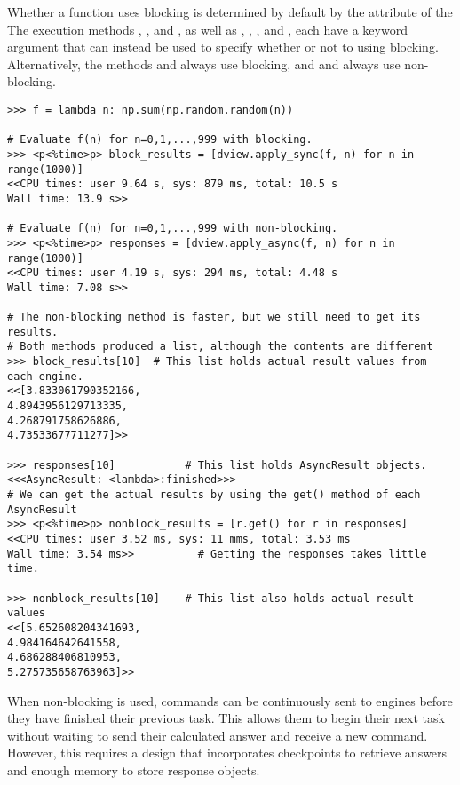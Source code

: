 Whether a function uses blocking is determined by default by the  attribute of the 
The execution methods , , and , as well as , , , and , each have a keyword argument  that can instead be used to specify whether or not to using blocking.
Alternatively, the methods  and  always use blocking, and  and  always use non-blocking.


\begin{lstlisting}
>>> f = lambda n: np.sum(np.random.random(n))

# Evaluate f(n) for n=0,1,...,999 with blocking.
>>> <p<%time>p> block_results = [dview.apply_sync(f, n) for n in range(1000)]
<<CPU times: user 9.64 s, sys: 879 ms, total: 10.5 s
Wall time: 13.9 s>>

# Evaluate f(n) for n=0,1,...,999 with non-blocking.
>>> <p<%time>p> responses = [dview.apply_async(f, n) for n in range(1000)]
<<CPU times: user 4.19 s, sys: 294 ms, total: 4.48 s
Wall time: 7.08 s>>

# The non-blocking method is faster, but we still need to get its results.
# Both methods produced a list, although the contents are different
>>> block_results[10]  # This list holds actual result values from each engine.
<<[3.833061790352166,
4.8943956129713335,
4.268791758626886,
4.73533677711277]>>

>>> responses[10]           # This list holds AsyncResult objects.
<<<AsyncResult: <lambda>:finished>>>
# We can get the actual results by using the get() method of each AsyncResult
>>> <p<%time>p> nonblock_results = [r.get() for r in responses]
<<CPU times: user 3.52 ms, sys: 11 mms, total: 3.53 ms
Wall time: 3.54 ms>>          # Getting the responses takes little time.

>>> nonblock_results[10]    # This list also holds actual result values
<<[5.652608204341693,
4.984164642641558,
4.686288406810953,
5.275735658763963]>>
\end{lstlisting}
When non-blocking is used, commands can be continuously sent to engines before they have finished their previous task.
This allows them to begin their next task without waiting to send their calculated answer and receive a new command.
However, this requires a design that incorporates checkpoints to retrieve answers and enough memory to store response objects.

